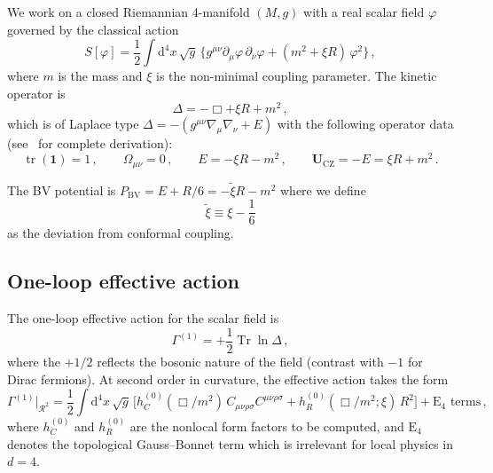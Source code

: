 \documentclass[11pt,a4paper]{article}
\newcommand{\Id}{\mathbf{1}}
\newcommand{\Tr}{\operatorname{Tr}}
\newcommand{\tr}{\operatorname{tr}}
\newcommand{\Weylsq}{C_{\mu\nu\rho\sigma}C^{\mu\nu\rho\sigma}}
\newcommand{\dd}{\mathrm{d}}
\newcommand{\xitilde}{\tilde{\xi}}
\theoremstyle{definition}
\theoremstyle{remark}
\begin{document}
We work on a closed Riemannian 4-manifold $(M,g)$ with a real scalar
field $\varphi$ governed by the classical action
\begin{equation}
  S[\varphi] = \frac{1}{2}\int \dd^4 x\,\sqrt{g}\,\bigl\{
    g^{\mu\nu}\partial_\mu\varphi\,\partial_\nu\varphi
    + (m^2 + \xi R)\,\varphi^2
  \bigr\}\,,
  \label{eq:scalar-action}
\end{equation}
where $m$ is the mass and $\xi$ is the non-minimal coupling parameter.
The kinetic operator is
\begin{equation}
  \Delta = -\Box + \xi R + m^2\,,
  \label{eq:Delta}
\end{equation}
which is of Laplace type $\Delta = -(g^{\mu\nu}\nabla_\mu\nabla_\nu + E)$
with the following operator data (see~\cite{NT1b_conventions} for
complete derivation):
\begin{equation}
  \boxed{
  \tr(\Id) = 1\,,\qquad
  \Omega_{\mu\nu} = 0\,,\qquad
  E = -\xi R - m^2\,,\qquad
  \mathbf{U}_{\text{CZ}} = -E = \xi R + m^2\,.
  }
  \label{eq:operator-data}
\end{equation}

The BV potential is $P_{\text{BV}} = E + R/6 = -\xitilde R - m^2$
where we define
\begin{equation}
  \xitilde \equiv \xi - \frac{1}{6}
  \label{eq:xitilde}
\end{equation}
as the deviation from conformal coupling.


\subsection{One-loop effective action}

The one-loop effective action for the scalar field is
\begin{equation}
  \Gamma^{(1)} = +\frac{1}{2}\Tr\ln\Delta\,,
  \label{eq:Gamma1}
\end{equation}
where the $+1/2$ reflects the bosonic nature of the field
(contrast with $-1$ for Dirac fermions).  At second order in
curvature, the effective action takes the form
\begin{equation}
  \Gamma^{(1)}\Big|_{\mathcal{R}^2}
  = \frac{1}{2}\int \dd^4 x\,\sqrt{g}\,\bigl[
    h_C^{(0)}(\Box/m^2)\,\Weylsq
    + h_R^{(0)}(\Box/m^2;\xi)\,R^2
  \bigr] + \text{E}_4\text{ terms}\,,
  \label{eq:eff-action-weyl}
\end{equation}
where $h_C^{(0)}$ and $h_R^{(0)}$ are the nonlocal form factors
to be computed, and $\text{E}_4$ denotes the topological Gauss--Bonnet
term which is irrelevant for local physics in $d=4$.
\end{document}
